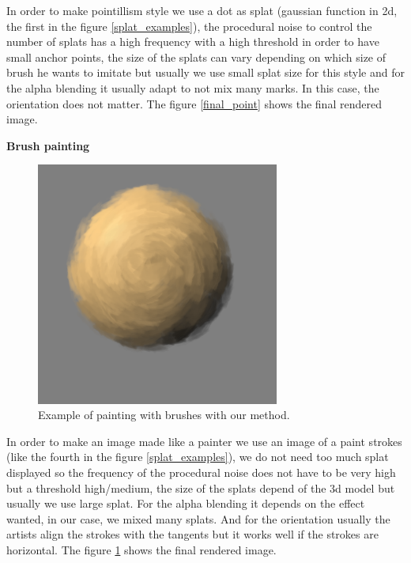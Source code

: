 In order to make pointillism style we use a dot as splat (gaussian function in 2d, the first in the figure \ref{splat_examples}), the procedural noise to control the number of splats has a high frequency with a high threshold in order to have small anchor points, the size of the splats can vary depending on which size of brush he wants to imitate but usually we use small splat size for this style and for the alpha blending it usually adapt to not mix many marks. In this case, the orientation does not matter. The figure \ref{final_point} shows the final rendered image. \newline

\textbf{Brush painting}

\begin{figure}[H]
    \begin{center}
    \includegraphics[width=80mm, height=80mm]{Resultats/painting1/final.png}
    \end{center}
    \caption{Example of painting with brushes with our method.}
    \label{final_brushes}
\end{figure}

In order to make an image made like a painter we use an image of a paint strokes (like the fourth in the figure \ref{splat_examples}), we do not need too much splat displayed so the frequency of the procedural noise does not have to be very high but a threshold high/medium, the size of the splats depend of the 3d model but usually we use large splat. For the alpha blending it depends on the effect wanted, in our case, we mixed many splats. And for the orientation usually the artists align the strokes with the tangents but it works well if the strokes are horizontal. The figure \ref{final_brushes} shows the final rendered image. \newline

